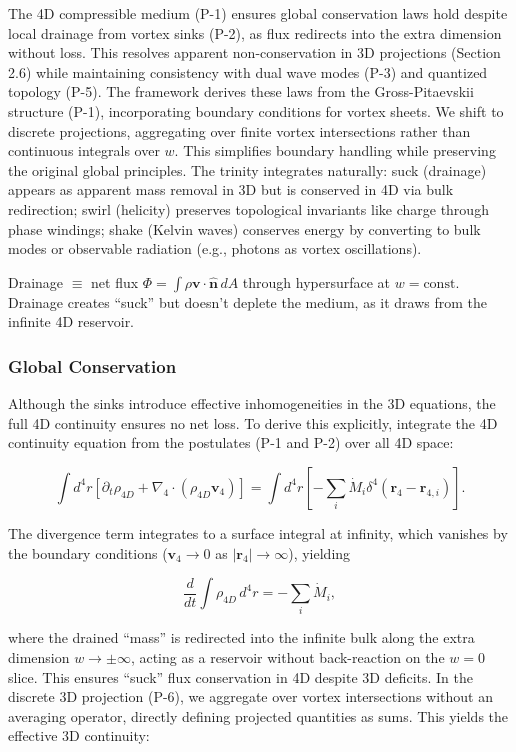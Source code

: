 The 4D compressible medium (P-1) ensures global conservation laws hold despite local drainage from vortex sinks (P-2), as flux redirects into the extra dimension without loss. This resolves apparent non-conservation in 3D projections (Section 2.6) while maintaining consistency with dual wave modes (P-3) and quantized topology (P-5). The framework derives these laws from the Gross-Pitaevskii structure (P-1), incorporating boundary conditions for vortex sheets. We shift to discrete projections, aggregating over finite vortex intersections rather than continuous integrals over $w$. This simplifies boundary handling while preserving the original global principles. The trinity integrates naturally: suck (drainage) appears as apparent mass removal in 3D but is conserved in 4D via bulk redirection; swirl (helicity) preserves topological invariants like charge through phase windings; shake (Kelvin waves) conserves energy by converting to bulk modes or observable radiation (e.g., photons as vortex oscillations).

Drainage $\equiv$ net flux $\Phi = \int \rho \mathbf{v} \cdot \hat{\mathbf{n}} \, dA$ through hypersurface at $w = \text{const}$. Drainage creates ``suck'' but doesn't deplete the medium, as it draws from the infinite 4D reservoir.

\subsubsection{Global Conservation}
Although the sinks introduce effective inhomogeneities in the 3D equations, the full 4D continuity ensures no net loss. To derive this explicitly, integrate the 4D continuity equation from the postulates (P-1 and P-2) over all 4D space:

\begin{equation}
\int d^4 r \left[ \partial_t \rho_{4D} + \nabla_4 \cdot (\rho_{4D} \mathbf{v}_4) \right] = \int d^4 r \left[ -\sum_i \dot{M}_i \delta^4(\mathbf{r}_4 - \mathbf{r}_{4,i}) \right].
\end{equation}

The divergence term integrates to a surface integral at infinity, which vanishes by the boundary conditions ($\mathbf{v}_4 \to 0$ as $|\mathbf{r}_4| \to \infty$), yielding

\begin{equation}
\frac{d}{dt} \int \rho_{4D} \, d^4 r = -\sum_i \dot{M}_i,
\end{equation}

where the drained ``mass'' is redirected into the infinite bulk along the extra dimension $w \to \pm \infty$, acting as a reservoir without back-reaction on the $w=0$ slice. This ensures ``suck'' flux conservation in 4D despite 3D deficits. In the discrete 3D projection (P-6), we aggregate over vortex intersections without an averaging operator, directly defining projected quantities as sums. This yields the effective 3D continuity:

